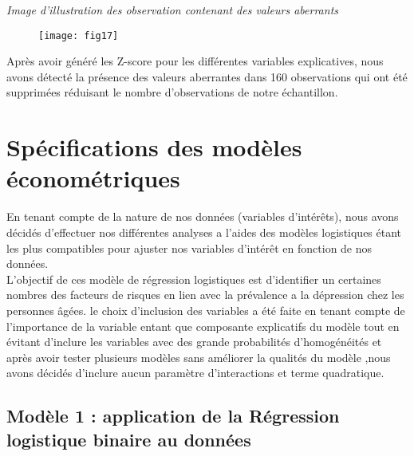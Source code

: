 \documentclass[a4paper]{article}
\begin{document}
\textit{Image d'illustration des observation contenant des valeurs aberrants}

	\begin{figure}[h!]
		\centering
		\texttt{[image: fig17]}
		\caption{}
		\label{fig:fig17}
	\end{figure}
\newpage
Après avoir généré les Z-score  pour les différentes variables explicatives, nous avons détecté la présence des valeurs aberrantes dans 160 observations qui ont été supprimées réduisant le nombre d’observations de notre échantillon.

\section{Spécifications des modèles économétriques} 

En tenant compte de la nature de nos données (variables d’intérêts), nous avons décidés d’effectuer nos différentes analyses a l’aides des modèles logistiques étant les plus compatibles pour  ajuster nos variables d’intérêt en fonction de nos données.\\
L’objectif de ces  modèle de régression logistiques est d’identifier un certaines nombres des facteurs de risques en lien avec la prévalence a la dépression chez les personnes âgées. le choix d’inclusion des variables a été faite en tenant compte de l’importance de la variable entant que composante explicatifs du modèle tout en évitant d’inclure les variables avec des grande probabilités d’homogénéités et après avoir tester plusieurs modèles sans améliorer la qualités du modèle ,nous avons décidés d’inclure aucun paramètre d’interactions et terme quadratique.


\subsection{Modèle 1 : application de la Régression logistique binaire au données}
\end{document}
